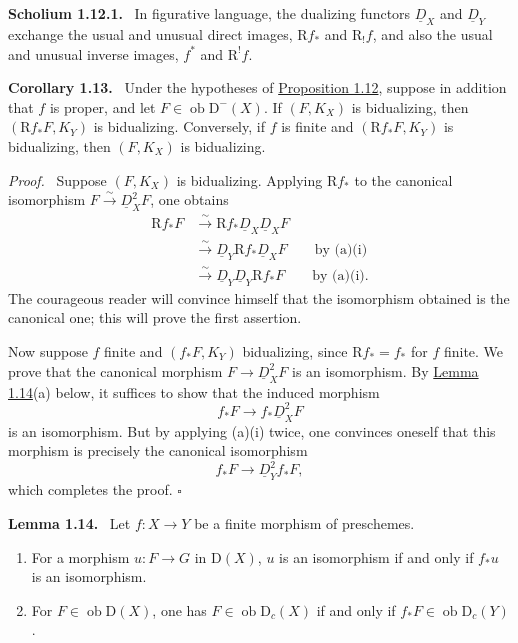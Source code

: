 \documentclass[11pt]{article}
\providecommand{\qedtext}{\hfill$\square$}
\newenvironment{statement}[1]{\par\medskip\noindent\textbf{#1.}\ }{\par\medskip}
\newenvironment{prooftext}[1][Proof]{\par\noindent\emph{#1.}\ }{\par\medskip}
\newcommand{\R}{\mathrm{R}}
\newcommand{\D}{\mathrm{D}}
\newcommand{\ob}{\operatorname{ob}}
\providecommand{\ob}{\operatorname{ob}}
\providecommand{\R}{\mathrm R}
\providecommand{\qedtext}{\hfill$\square$}
\begin{document}
\label{sga5:I:scholium:1.12.1}\begin{statement}{Scholium 1.12.1}
In figurative language, the dualizing functors $\underline D_X$ and $\underline D_Y$ exchange the usual and unusual direct images, $\R f_*$ and $\R_!f$, and also the usual and unusual inverse images, $f^*$ and $\R^!f$.
\end{statement}

\label{sga5:I:corollary:1.13}\begin{statement}{Corollary 1.13}
Under the hypotheses of \hyperref[sga5:I:proposition:1.12]{Proposition 1.12}, suppose in addition that $f$ is proper, and let $F\in\ob\D^-(X)$. If $(F,K_X)$ is bidualizing, then $(\R f_*F,K_Y)$ is bidualizing. Conversely, if $f$ is finite and $(\R f_*F,K_Y)$ is bidualizing, then $(F,K_X)$ is bidualizing.
\end{statement}

\begin{prooftext}
Suppose $(F,K_X)$ is bidualizing. Applying $\R f_*$ to the canonical isomorphism $F\xrightarrow{\sim}\underline D_X^2F$, one obtains\begin{align*}
\R f_*F &\xrightarrow{\sim}\R f_*\underline D_X\underline D_XF \\
&\xrightarrow{\sim}\underline D_Y\R f_*\underline D_XF \qquad \text{by (a)(i)}\\
&\xrightarrow{\sim}\underline D_Y\underline D_Y\R f_*F \qquad \text{by (a)(i)}.
\end{align*}
The courageous reader will convince himself that the isomorphism obtained is the canonical one; this will prove the first assertion.

Now suppose $f$ finite and $(f_*F,K_Y)$ bidualizing, since $\R f_*=f_*$ for $f$ finite. We prove that the canonical morphism $F\to\underline D_X^2F$ is an isomorphism. By \hyperref[sga5:I:lemma:1.14]{Lemma 1.14}(a) below, it suffices to show that the induced morphism
\[
   f_*F\longrightarrow f_*\underline D_X^2F
\]
is an isomorphism. But by applying (a)(i) twice, one convinces oneself that this morphism is precisely the canonical isomorphism
\[
   f_*F\longrightarrow \underline D_Y^2f_*F,
\]
which completes the proof. \qedtext
\end{prooftext}

\label{sga5:I:lemma:1.14}\begin{statement}{Lemma 1.14}
Let $f:X\to Y$ be a finite morphism of preschemes.
\begin{enumerate}[label=\alph*)]
\item For a morphism $u:F\to G$ in $\D(X)$, $u$ is an isomorphism if and only if $f_*u$ is an isomorphism.
\item For $F\in\ob\D(X)$, one has $F\in\ob\D_c(X)$ if and only if $f_*F\in\ob\D_c(Y)$.
\end{enumerate}
\end{statement}
\end{document}
